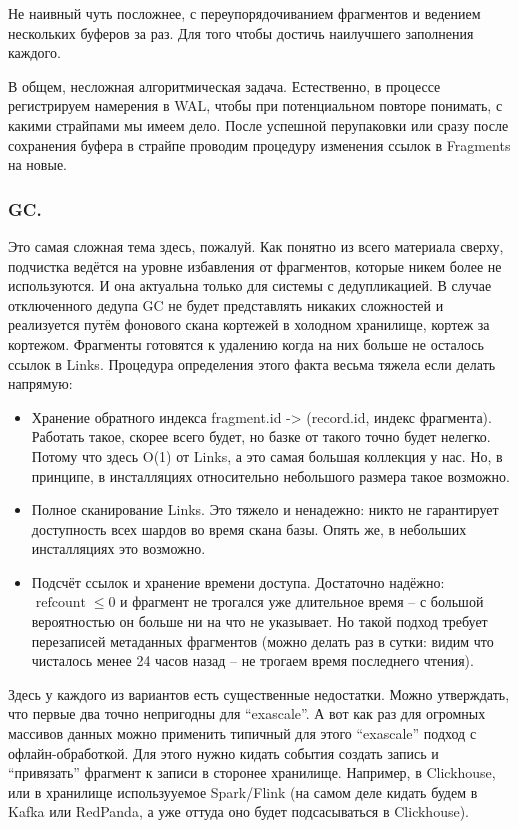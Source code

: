 \documentclass[a4paper,12pt]{article}
\begin{document}
Не наивный чуть посложнее, с переупорядочиванием фрагментов и ведением нескольких буферов за раз. Для того чтобы достичь наилучшего
заполнения каждого.

В общем, несложная алгоритмическая задача. Естественно, в процессе регистрируем намерения в WAL, чтобы при потенциальном повторе понимать,
с какими страйпами мы имеем дело. После успешной перупаковки или сразу после сохранения буфера в страйпе проводим процедуру изменения
ссылок в Fragments на новые.

\subsubsection{GC.}
Это самая сложная тема здесь, пожалуй. Как понятно из всего материала сверху, подчистка ведётся на уровне избавления от фрагментов, которые никем более не используются.
И она актуальна только для системы с дедупликацией. В случае отключенного дедупа GC не будет представлять никаких сложностей и реализуется путём фонового
скана кортежей в холодном хранилище, кортеж за кортежом.
\smallskip
Фрагменты готовятся к удалению когда на них больше не осталось ссылок в Links. Процедура определения этого факта весьма тяжела если делать напрямую:
\begin{itemize}
\item Хранение обратного индекса fragment.id -> (record.id, индекс фрагмента). Работать такое, скорее всего будет, но базке от такого точно будет нелегко.
Потому что здесь O(1) от Links, а это самая большая коллекция у нас. Но, в принципе, в инсталляциях относительно небольшого размера такое возможно.
\item Полное сканирование Links. Это тяжело и ненадежно: никто не гарантирует доступность всех шардов во время скана базы. Опять же, в небольших инсталляциях это возможно.
\item Подсчёт ссылок и хранение времени доступа. Достаточно надёжно: $\operatorname{refcount} \leqslant 0$ и фрагмент не трогался уже длительное время – с большой вероятностью он больше ни на что не указывает.
Но такой подход требует перезаписей метаданных фрагментов (можно делать раз в сутки: видим что чисталось менее 24 часов назад – не трогаем время последнего чтения).
\end{itemize}

Здесь у каждого из вариантов есть существенные недостатки. Можно утверждать, что первые два точно непригодны для \enquote{exascale}. А вот как раз для огромных массивов данных
можно применить типичный для этого \enquote{exascale} подход с офлайн-обработкой. Для этого нужно кидать события создать запись и \enquote{привязать} фрагмент к записи в сторонее хранилище.
Например, в Clickhouse, или в хранилище использууемое Spark/Flink (на самом деле кидать будем в Kafka или RedPanda, а уже оттуда оно будет подсасываться в Clickhouse).
\end{document}
